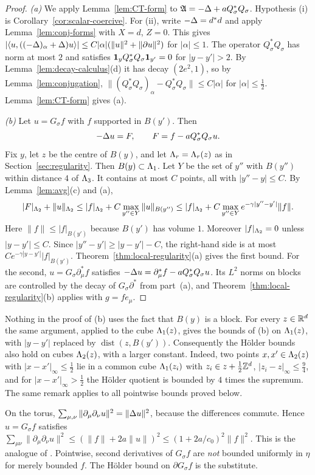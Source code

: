 \begin{proof}
\emph{(a)} We apply Lemma~\ref{lem:CT-form} to $\mathfrak A=-\Delta+aQ_\sigma^*Q_\sigma$. Hypothesis (i) is Corollary~\ref{cor:scalar-coercive}. For (ii), write $-\Delta=d^*d$ and apply Lemma~\ref{lem:conj-forms} with $X=d$, $Z=0$. This gives $|\langle u,((-\Delta)_\alpha+\Delta)u\rangle|\le C|\alpha|(\|u\|^2+\|\partial u\|^2)$ for $|\alpha|\le1$. The operator $Q_\sigma^*Q_\sigma$ has norm at most $2$ and satisfies $\mathbf 1_yQ_\sigma^*Q_\sigma\mathbf 1_{y'}=0$ for $|y-y'|>2$. By Lemma~\ref{lem:decay-calculus}(d) it has decay $(2e^2,1)$, so by Lemma~\ref{lem:conjugation}, $\|(Q_\sigma^*Q_\sigma)_\alpha-Q_\sigma^*Q_\sigma\|\le C|\alpha|$ for $|\alpha|\le\frac12$. Lemma~\ref{lem:CT-form} gives (a).

\emph{(b)} Let $u=G_\sigma f$ with $f$ supported in $B(y')$. Then
\[
-\Delta u=F,\qquad F=f-aQ_\sigma^*Q_\sigma u .
\]
Fix $y$, let $z$ be the centre of $B(y)$, and let $\Lambda_r=\Lambda_r(z)$ as in Section~\ref{sec:regularity}. Then $B(y)\subset\Lambda_1$. Let $Y$ be the set of $y''$ with $B(y'')$ within distance $4$ of $\Lambda_3$. It contains at most $C$ points, all with $|y''-y|\le C$. By Lemma~\ref{lem:avg}(c) and (a),
\[
|F|_{\Lambda_2}+\|u\|_{\Lambda_2}\le|f|_{\Lambda_2}+C\max_{y''\in Y}\|u\|_{B(y'')}\le|f|_{\Lambda_2}+C\max_{y''\in Y}e^{-\gamma|y''-y'|}\|f\|.
\]
Here $\|f\|\le|f|_{B(y')}$ because $B(y')$ has volume $1$. Moreover $|f|_{\Lambda_2}=0$ unless $|y-y'|\le C$. Since $|y''-y'|\ge|y-y'|-C$, the right-hand side is at most $Ce^{-\gamma|y-y'|}|f|_{B(y')}$. Theorem~\ref{thm:local-regularity}(a) gives the first bound. For the second, $u=G_\sigma\partial^*_\mu f$ satisfies $-\Delta u=\partial^*_\mu f-aQ_\sigma^*Q_\sigma u$. Its $L^2$ norms on blocks are controlled by the decay of $G_\sigma\partial^*$ from part~(a), and Theorem~\ref{thm:local-regularity}(b) applies with $g=fe_\mu$.
\end{proof}

\begin{remark}\label{rem:cubes}
Nothing in the proof of (b) uses the fact that $B(y)$ is a block. For every $z\in\mathbb R^d$ the same argument, applied to the cube $\Lambda_1(z)$, gives the bounds of (b) on $\Lambda_1(z)$, with $|y-y'|$ replaced by $\operatorname{dist}(z,B(y'))$. Consequently the H\"older bounds also hold on cubes $\Lambda_2(z)$, with a larger constant. Indeed, two points $x,x'\in\Lambda_2(z)$ with $|x-x'|_\infty\le\frac12$ lie in a common cube $\Lambda_1(z_i)$ with $z_i\in z+\frac12\mathbb Z^d$, $|z_i-z|_\infty\le\frac94$, and for $|x-x'|_\infty>\frac12$ the H\"older quotient is bounded by $4$ times the supremum. The same remark applies to all pointwise bounds proved below.
\end{remark}

\begin{remark}[$L^2$ regularity]
On the torus, $\sum_{\mu,\nu}\|\partial_\mu\partial_\nu u\|^2=\|\Delta u\|^2$, because the differences commute. Hence $u=G_\sigma f$ satisfies $\sum_{\mu\nu}\|\partial_\mu\partial_\nu u\|^2\le(\|f\|+2a\|u\|)^2\le(1+2a/c_0)^2\|f\|^2$. This is the analogue of \cite[Prop.~1.1]{BalPropI}. Pointwise, second derivatives of $G_\sigma f$ are \emph{not} bounded uniformly in $\eta$ for merely bounded $f$. The H\"older bound on $\partial G_\sigma f$ is the substitute.
\end{remark}
